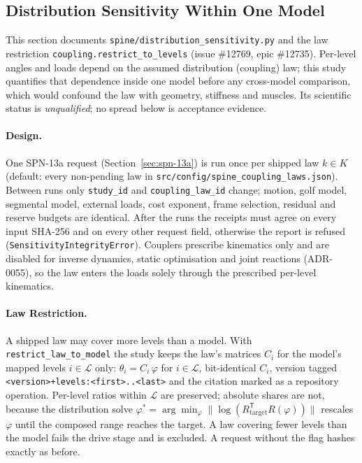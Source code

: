 \subsection{Distribution Sensitivity Within One Model}
\label{sec:spn-14a}

This section documents \texttt{spine/distribution\_sensitivity.py} and the
law restriction \texttt{coupling.restrict\_to\_levels} (issue \#12769, epic
\#12735). Per-level angles and loads depend on the assumed distribution
(coupling) law; this study quantifies that dependence inside one model before
any cross-model comparison, which would confound the law with geometry,
stiffness and muscles. Its scientific status is \emph{unqualified}; no spread
below is acceptance evidence.

\paragraph{Design.}
One SPN-13a request (Section~\ref{sec:spn-13a}) is run once per shipped law
$k\in K$ (default: every non-pending law in
\texttt{src/config/spine\_coupling\_laws.json}). Between runs only
\texttt{study\_id} and \texttt{coupling\_law\_id} change; motion, golf model,
segmental model, external loads, cost exponent, frame selection, residual and
reserve budgets are identical. After the runs the receipts must agree on every
input SHA-256 and on every other request field, otherwise the report is
refused (\texttt{SensitivityIntegrityError}). Couplers prescribe kinematics
only and are disabled for inverse dynamics, static optimisation and joint
reactions (ADR-0055), so the law enters the loads solely through the
prescribed per-level kinematics.

\paragraph{Law Restriction.}
A shipped law may cover more levels than a model. With
\texttt{restrict\_law\_to\_model} the study keeps the law's matrices $C_i$ for
the model's mapped levels $i\in\mathcal L$ only:
$\theta_i = C_i\,\varphi$ for $i\in\mathcal L$, bit-identical $C_i$, version
tagged \texttt{<version>+levels:<first>..<last>} and the citation marked as a
repository operation. Per-level ratios within $\mathcal L$ are preserved;
absolute shares are not, because the distribution solve
$\varphi^\ast=\arg\min_\varphi\|\log(R_{\mathrm{target}}^{\mathsf T}R(\varphi))\|$
rescales $\varphi$ until the composed range reaches the target. A law covering
fewer levels than the model fails the drive stage and is excluded. A request
without the flag hashes exactly as before.

